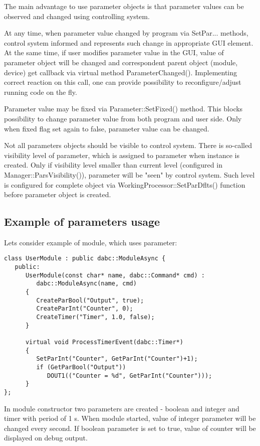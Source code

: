 The main advantage to use parameter objects is that parameter values can be 
observed and changed using controlling system.

At any time, when parameter value changed by program via SetPar... methods, 
control system informed and represents such change in appropriate GUI element.
At the same time, if user modifies parameter value in the GUI, value of parameter object
will be changed and correspondent parent object (module, device) get callback via 
virtual method ParameterChanged(). Implementing correct reaction on this call, 
one can provide possibility to reconfigure/adjust running code on the fly.

Parameter value may be fixed via Parameter::SetFixed() method. This blocks possibility 
to change parameter value from both program and user side. Only when fixed flag set again to false,
parameter value can be changed. 

Not all parameters objects should be visible to control system. There is so-called 
visibility level of parameter, which is assigned to parameter when instance is created.
Only if visibility level smaller than current level (configured in Manager::ParsVisibility()),
parameter will be "seen" by control system. Such level is configured for complete object 
via WorkingProcessor::SetParDflts() function before parameter object is created.


\subsection{Example of parameters usage}

Lets consider example of module, which uses parameter:

\begin{verbatim}
class UserModule : public dabc::ModuleAsync {
   public:
      UserModule(const char* name, dabc::Command* cmd) : 
         dabc::ModuleAsync(name, cmd)
      {
         CreateParBool("Output", true);
         CreateParInt("Counter", 0);
         CreateTimer("Timer", 1.0, false);
      }
      
      virtual void ProcessTimerEvent(dabc::Timer*)
      {
         SetParInt("Counter", GetParInt("Counter")+1);
         if (GetParBool("Output")) 
            DOUT1(("Counter = %d", GetParInt("Counter")));
      }
}; 
\end{verbatim}

In module constructor two parameters are created - boolean and integer and timer with period of 1 s.
When module started, value of integer parameter will be changed every second.
If boolean parameter is set to true, value of counter will be displayed on debug output.

